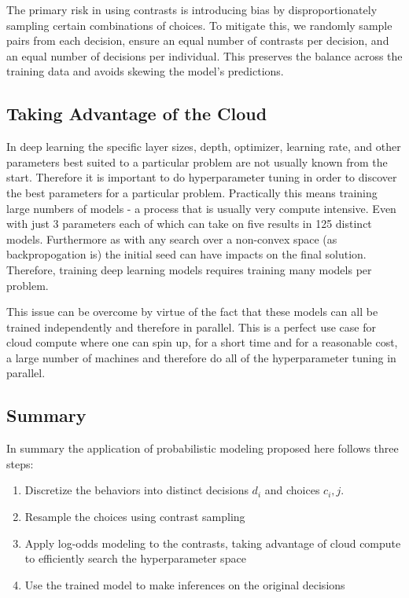 \documentclass[11pt]{article}
\begin{document}
The primary risk in using contrasts is introducing bias by disproportionately sampling certain combinations of choices. To mitigate this, we randomly sample pairs from each decision, ensure an equal number of contrasts per decision, and an equal number of decisions per individual. This preserves the balance across the training data and avoids skewing the model's predictions.

\subsection*{Taking Advantage of the Cloud}

In deep learning the specific layer sizes, depth, optimizer, learning rate, and other parameters best suited to a particular problem are not usually known from the start. Therefore it is important to do hyperparameter tuning in order to discover the best parameters for a particular problem. Practically this means training large numbers of models - a process that is usually very compute intensive. Even with just 3 parameters each of which can take on five results in 125 distinct models. Furthermore as with any search over a non-convex space (as backpropogation is) the initial seed can have impacts on the final solution. Therefore, training deep learning models requires training many models per problem.

This issue can be overcome by virtue of the fact that these models can all be trained independently and therefore in parallel. This is a perfect use case for cloud compute where one can spin up, for a short time and for a reasonable cost, a large number of machines and therefore do all of the hyperparameter tuning in parallel. 

\subsection*{Summary}

In summary the application of probabilistic modeling proposed here follows three steps:

\begin{enumerate}
\item Discretize the behaviors into distinct decisions $d_i$ and choices $c_i,j$. 
\item Resample the choices using contrast sampling
\item Apply log-odds modeling to the contrasts, taking advantage of cloud compute to efficiently search the hyperparameter space
\item Use the trained model to make inferences on the original decisions
\end{enumerate}
\end{document}
